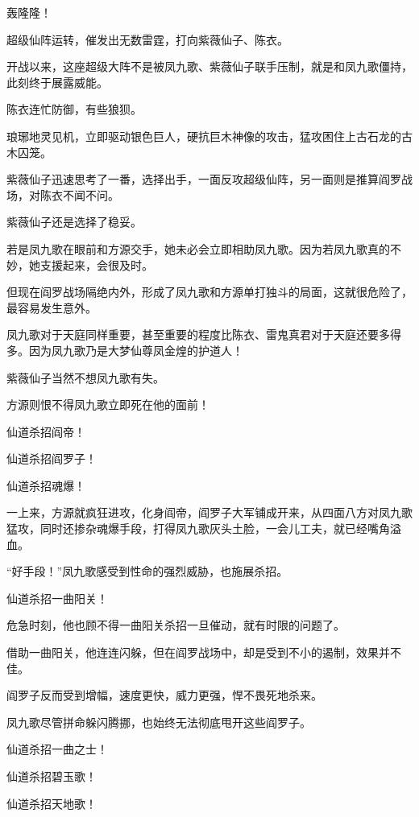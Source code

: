 
\begin{this_body}

轰隆隆！

超级仙阵运转，催发出无数雷霆，打向紫薇仙子、陈衣。

开战以来，这座超级大阵不是被凤九歌、紫薇仙子联手压制，就是和凤九歌僵持，此刻终于展露威能。

陈衣连忙防御，有些狼狈。

琅琊地灵见机，立即驱动银色巨人，硬抗巨木神像的攻击，猛攻困住上古石龙的古木囚笼。

紫薇仙子迅速思考了一番，选择出手，一面反攻超级仙阵，另一面则是推算阎罗战场，对陈衣不闻不问。

紫薇仙子还是选择了稳妥。

若是凤九歌在眼前和方源交手，她未必会立即相助凤九歌。因为若凤九歌真的不妙，她支援起来，会很及时。

但现在阎罗战场隔绝内外，形成了凤九歌和方源单打独斗的局面，这就很危险了，最容易发生意外。

凤九歌对于天庭同样重要，甚至重要的程度比陈衣、雷鬼真君对于天庭还要多得多。因为凤九歌乃是大梦仙尊凤金煌的护道人！

紫薇仙子当然不想凤九歌有失。

方源则恨不得凤九歌立即死在他的面前！

仙道杀招阎帝！

仙道杀招阎罗子！

仙道杀招魂爆！

一上来，方源就疯狂进攻，化身阎帝，阎罗子大军铺成开来，从四面八方对凤九歌猛攻，同时还掺杂魂爆手段，打得凤九歌灰头土脸，一会儿工夫，就已经嘴角溢血。

“好手段！”凤九歌感受到性命的强烈威胁，也施展杀招。

仙道杀招一曲阳关！

危急时刻，他也顾不得一曲阳关杀招一旦催动，就有时限的问题了。

借助一曲阳关，他连连闪躲，但在阎罗战场中，却是受到不小的遏制，效果并不佳。

阎罗子反而受到增幅，速度更快，威力更强，悍不畏死地杀来。

凤九歌尽管拼命躲闪腾挪，也始终无法彻底甩开这些阎罗子。

仙道杀招一曲之士！

仙道杀招碧玉歌！

仙道杀招天地歌！


\end{this_body}
